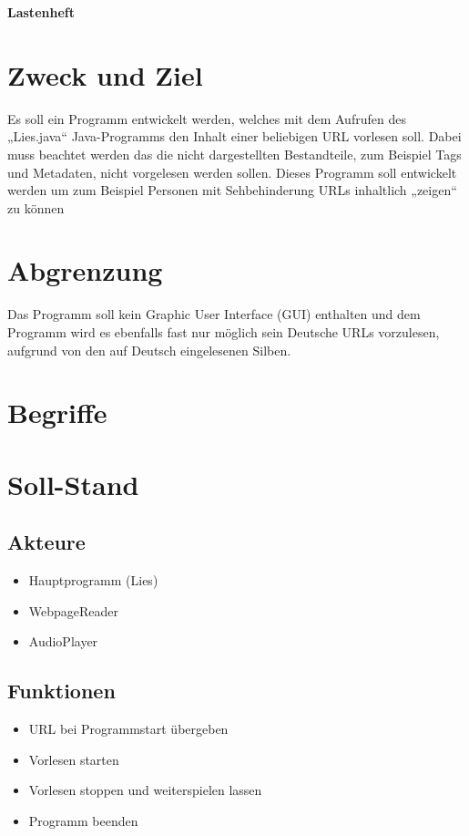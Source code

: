 \documentclass[11pt]{scrartcl}
\begin{document}
\begin{center}
\textbf{Lastenheft}
\end{center}

\section{Zweck und Ziel}
Es soll ein Programm entwickelt werden, welches mit dem Aufrufen des „Lies.java“ Java-Programms den Inhalt einer beliebigen URL vorlesen soll. Dabei muss beachtet werden das die nicht dargestellten Bestandteile, zum Beispiel Tags und Metadaten, nicht vorgelesen werden sollen. Dieses Programm soll entwickelt werden um zum Beispiel Personen mit Sehbehinderung URLs inhaltlich „zeigen“ zu können

\section{Abgrenzung}
Das Programm soll kein Graphic User Interface (GUI) enthalten und dem Programm wird es ebenfalls fast nur möglich sein Deutsche URLs vorzulesen, aufgrund von den auf Deutsch eingelesenen Silben.

\section{Begriffe}


\section{Soll-Stand}


\subsection{Akteure}

\begin{itemize}
	\item Hauptprogramm (Lies)
	\item WebpageReader
	\item AudioPlayer
\end{itemize}

\subsection{Funktionen}

\begin{itemize}
	\item URL bei Programmstart übergeben
	\item Vorlesen starten
	\item Vorlesen stoppen und weiterspielen lassen
	\item Programm beenden
\end{itemize}
\end{document}
